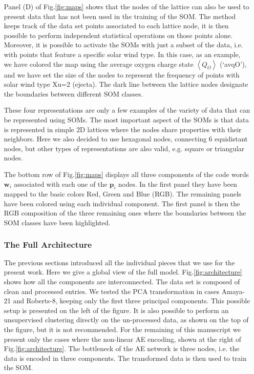 \documentclass[utf8]{frontiersSCNS} %
\begin{document}
Panel (D) of Fig.\ref{fig:maps} shows that the nodes of the lattice can also be used to present data that has not been used in the training of the SOM. The method keeps track of the data set points associated to each lattice node, it is then possible to perform independent statistical operations on those points alone. Moreover, it is possible to activate the SOMs with just a subset of the data, i.e. with points that feature a specific solar wind type. In this case, as an example, we have colored the map using the average oxygen charge state $\left<Q_{O}\right>$ (`avqO'), and we have set the size of the nodes to represent the frequency of points with solar wind type Xu=2 (ejecta). The dark line between the lattice nodes designate the boundaries between different SOM classes.

These four representations are only a few examples of the variety of data that can be represented using SOMs. The most important aspect of the SOMs is that data is represented in simple 2D lattices where the nodes share properties with their neighbors. Here we also decided to use hexagonal nodes, connecting 6 equidistant nodes, but other types of representations are also valid, e.g. square or triangular nodes.

The bottom row of Fig.\ref{fig:maps} displays all three components of the code words $\boldsymbol{w}_i$ associated with each one of the $\boldsymbol{p}_i$ nodes. In the first panel they have been mapped to the basic colors Red, Green and Blue (RGB). The remaining panels have been colored using each individual component. The first panel is then the RGB composition of the three remaining ones where the boundaries between the SOM classes have been highlighted.

\subsubsection{The Full Architecture}
\label{sec:fullarchi}
The previous sections introduced all the individual pieces that we use for the present work. Here we give a global view of the full model. Fig.\ref{fig:architecture} shows how all the components are interconnected. The data set is composed of clean and processed entries. We tested the PCA transformation in cases Amaya-21 and Roberts-8, keeping only the first three principal components. This possible setup is presented on the left of the figure. It is also possible to perform an unsupervised clustering directly on the un-processed data, as shown on the top of the figure, but it is not recommended. For the remaining of this manuscript we present only the cases where the non-linear AE encoding, shown at the right of Fig.\ref{fig:architecture}. The bottleneck of the AE network is three nodes, i.e. the data is encoded in three components. The transformed data is then used to train the SOM.
\end{document}
